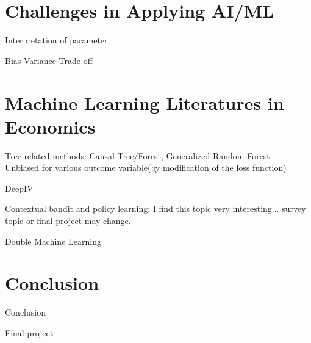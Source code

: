 \documentclass[11pt]{article}
\begin{document}
	\section{Challenges in Applying AI/ML}
	Interpretation of parameter
	
	Bias Variance Trade-off
	
	\section{Machine Learning Literatures in Economics}
	Tree related methods: Causal Tree/Forest, Generalized Random Forest - Unbiased for various outcome variable(by modification of the loss function)
	
	DeepIV
	
	Contextual bandit and policy learning: I find this topic very interesting... survey topic or final project may change.
	
	Double Machine Learning
	
	\section{Conclusion}
	Conclusion
	
	Final project
	
	
	
	
	
\end{document}
